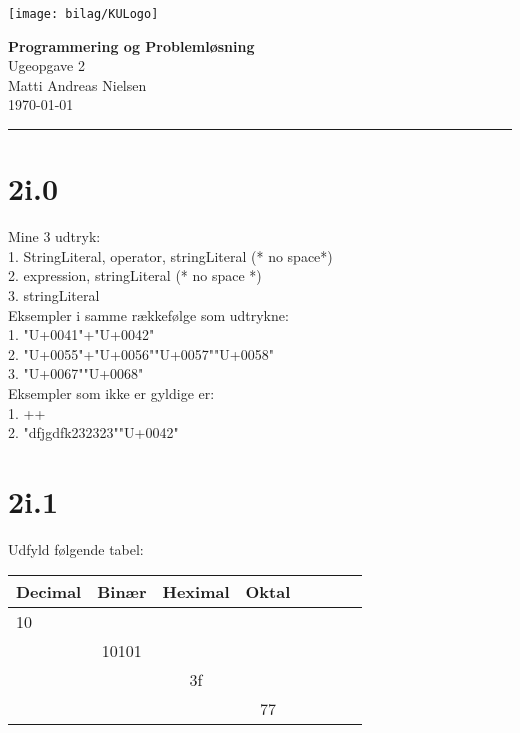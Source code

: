 \documentclass[12pt, a4paper, hidelinks]{article}
\begin{document}
\begin{minipage}[b]{1.0\linewidth}
\texttt{[image: bilag/KULogo]}

\vspace*{-16ex}
\begin{center}
    {\Large \bf Programmering og Problemløsning} \vspace*{1ex} \\
    {\large Ugeopgave 2} \vspace*{1ex} \\
    {\large Matti Andreas Nielsen  } \\
    {\large \today{}  }
\end{center}
\vspace*{-3pt}
{\color{KU-red}\hrule}
\end{minipage}
\vspace{2ex}

\tableofcontents \newpage

\section{2i.0 }

Mine 3 udtryk:\\
1. StringLiteral, operator, stringLiteral (* no space*)\\
2. expression, stringLiteral (* no space *)\\
3. stringLiteral\\

Eksempler i samme rækkefølge som udtrykne:\\
1. "U+0041"+"U+0042"\\
2. "U+0055"+"U+0056""U+0057""U+0058"\\
3. "U+0067""U+0068"\\


Eksempler som ikke er gyldige er: \\
1. ++  \\
2. "dfjgdfk232323""U+0042"\\


\section{2i.1}
Udfyld følgende tabel:\\

\begin{tabular}{l*{6}{c}r}
Decimal & Binær & Heximal & Oktal \\
\hline
10 &  & &     \\
& 10101 & &  \\
& & 3f &      \\
& & & 77      \\
\end{tabular}
\end{document}
